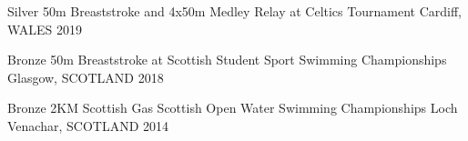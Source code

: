 

\begin{cvhonors}

  \cvhonor
    {Silver} %
    {50m Breaststroke and 4x50m Medley Relay at Celtics Tournament} %
    {Cardiff, WALES} %
    {2019} %

  \cvhonor
    {Bronze} %
    {50m Breaststroke at Scottish Student Sport Swimming Championships} %
    {Glasgow, SCOTLAND} %
    {2018} %


  \cvhonor
    {Bronze} %
    {2KM Scottish Gas Scottish Open Water Swimming Championships} %
    {Loch Venachar, SCOTLAND} %
    {2014} %
    

\end{cvhonors}
